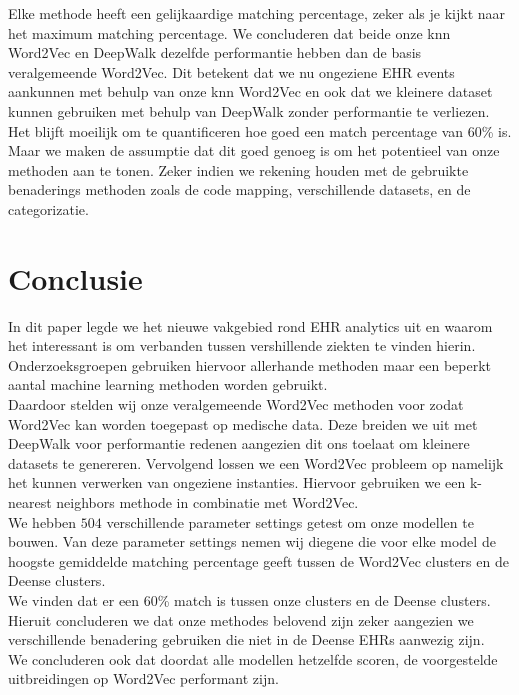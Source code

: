 \documentclass[11pt, final, journal, twoside, a4paper]{IEEEtran}
\begin{document}
Elke methode heeft een gelijkaardige matching percentage, zeker als je kijkt naar het maximum matching percentage. We concluderen dat beide onze knn Word2Vec en DeepWalk dezelfde performantie hebben dan de basis veralgemeende Word2Vec. Dit betekent dat we nu ongeziene EHR events aankunnen met behulp van onze knn Word2Vec en ook dat we kleinere dataset kunnen gebruiken met behulp van DeepWalk zonder performantie te verliezen. \\

Het blijft moeilijk om te quantificeren hoe goed een match percentage van $60$\% is. Maar we maken de assumptie dat dit goed genoeg is om het potentieel van onze methoden aan te tonen. Zeker indien we rekening houden met de gebruikte benaderings methoden zoals de code mapping, verschillende datasets, en de categorizatie.

\section{Conclusie}

In dit paper legde we het nieuwe vakgebied rond EHR analytics uit en waarom het interessant is om verbanden tussen vershillende ziekten te vinden hierin. Onderzoeksgroepen gebruiken hiervoor allerhande methoden maar een beperkt aantal machine learning methoden worden gebruikt. \\

Daardoor stelden wij onze veralgemeende Word2Vec methoden voor zodat Word2Vec kan worden toegepast op medische data. Deze breiden we uit met DeepWalk voor performantie redenen aangezien dit ons toelaat om kleinere datasets te genereren. Vervolgend lossen we een Word2Vec probleem op namelijk het kunnen verwerken van ongeziene instanties. Hiervoor gebruiken we een k-nearest neighbors methode in combinatie met Word2Vec. \\

We hebben $504$ verschillende parameter settings getest om onze modellen te bouwen. Van deze parameter settings nemen wij diegene die voor elke model de hoogste gemiddelde matching percentage geeft tussen de Word2Vec clusters en de Deense clusters. \\

We vinden dat er een $60$\% match is tussen onze clusters en de Deense clusters. Hieruit concluderen we dat onze methodes belovend zijn zeker aangezien we verschillende benadering gebruiken die niet in de Deense EHRs aanwezig zijn. \\
We concluderen ook dat doordat alle modellen hetzelfde scoren, de voorgestelde uitbreidingen op Word2Vec performant zijn.
\end{document}
